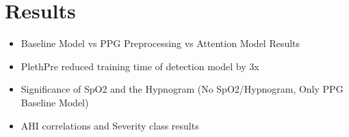 \chapter{Results \label{Chapter-Results}}

\begin{itemize}
    \item Baseline Model vs PPG Preprocessing vs Attention Model Results
    \item PlethPre reduced training time of detection model by 3x
    \item Significance of SpO2 and the Hypnogram (No SpO2/Hypnogram, Only PPG Baseline Model)
    \item AHI correlations and Severity class results
\end{itemize}